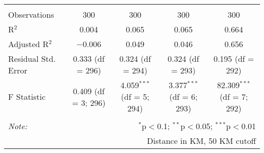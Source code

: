\begin{table}[!htbp]
\begin{tabular}{@{\extracolsep{5pt}}lcccc}
  & & & & \\ 
\hline \\[-1.8ex] 
Observations & 300 & 300 & 300 & 300 \\ 
R$^{2}$ & 0.004 & 0.065 & 0.065 & 0.664 \\ 
Adjusted R$^{2}$ & $-$0.006 & 0.049 & 0.046 & 0.656 \\ 
Residual Std. Error & 0.333 (df = 296) & 0.324 (df = 294) & 0.324 (df = 293) & 0.195 (df = 292) \\ 
F Statistic & 0.409 (df = 3; 296) & 4.059$^{***}$ (df = 5; 294) & 3.377$^{***}$ (df = 6; 293) & 82.309$^{***}$ (df = 7; 292) \\ 
\hline 
\hline \\[-1.8ex] 
\textit{Note:}  & \multicolumn{4}{r}{$^{*}$p$<$0.1; $^{**}$p$<$0.05; $^{***}$p$<$0.01} \\ 
 & \multicolumn{4}{r}{Distance in KM, 50 KM cutoff} \\ 
\end{tabular} 
\end{table} 
